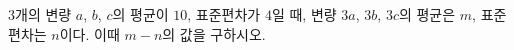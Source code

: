 $3$개의 변량 $a$, $b$, $c$의 평균이 $10$, 표준편차가 $4$일 때, 변량 $3a$, $3b$, $3c$의 평균은 $m$, 표준편차는 $n$이다. 이때 $m-n$의 값을 구하시오.
